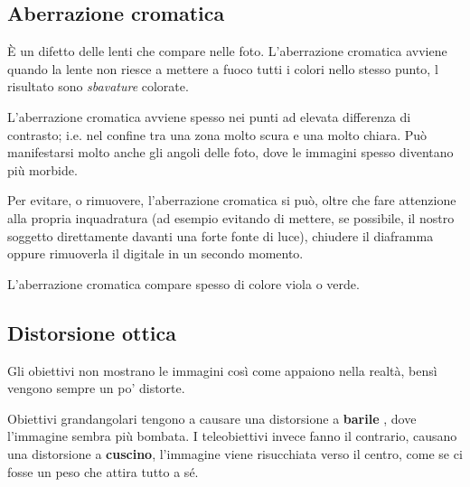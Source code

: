 \subsection{Aberrazione cromatica} \label{subsec:abberrazione}
È un difetto delle lenti che compare nelle foto. L'aberrazione cromatica avviene quando la lente non riesce a mettere a fuoco tutti i colori nello stesso punto, l risultato sono \textit{sbavature} colorate.

L'aberrazione cromatica avviene spesso nei punti ad elevata differenza di contrasto; i.e. nel confine tra una zona molto scura e una molto chiara.
Può manifestarsi molto anche gli angoli delle foto, dove le immagini spesso diventano più morbide.

Per evitare, o rimuovere, l'aberrazione cromatica si può, oltre che fare attenzione alla propria inquadratura (ad esempio evitando di mettere, se possibile, il nostro soggetto direttamente davanti una forte fonte di luce),
chiudere il diaframma oppure rimuoverla il digitale in un secondo momento.

L'aberrazione cromatica compare spesso di colore viola o verde.


\subsection{Distorsione ottica} \label{subsec:distorsioneottica}
Gli obiettivi non mostrano le immagini così come appaiono nella realtà, bensì vengono sempre un po' distorte.

Obiettivi grandangolari tengono a causare una distorsione a \textbf{barile} \label{def:distorsionebarile}, dove l'immagine sembra più bombata.
I teleobiettivi invece fanno il contrario, causano una distorsione a \textbf{cuscino}\label{def:distorsionecuscino}, l'immagine viene risucchiata verso il centro, come se ci fosse un peso che attira tutto a sé.